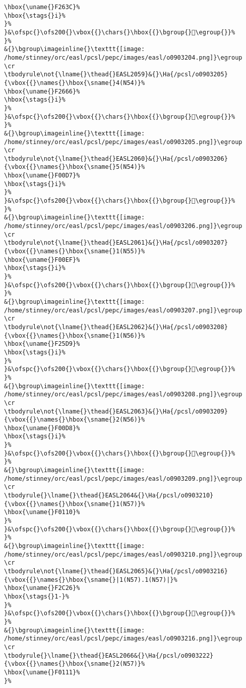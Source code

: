 \begin{verbatim}
\hbox{\uname{}F263C}%
\hbox{\stags{}i}%
}%
}&\ofspc{}\ofs200{}\vbox{{}\chars{}\hbox{{}\bgroup{}󲘼\egroup{}}%
}%
&{}\bgroup\imageinline{}\texttt{[image: /home/stinney/orc/easl/pcsl/pepc/images/easl/o0903204.png]}\egroup
\cr
\tbodyrule\not{\lname{}\thead{}EASL2059}&{}\Ha{/pcsl/o0903205}{\vbox{{}\names{}\hbox{\sname{}4(N54)}%
\hbox{\uname{}F2666}%
\hbox{\stags{}i}%
}%
}&\ofspc{}\ofs200{}\vbox{{}\chars{}\hbox{{}\bgroup{}󲙦\egroup{}}%
}%
&{}\bgroup\imageinline{}\texttt{[image: /home/stinney/orc/easl/pcsl/pepc/images/easl/o0903205.png]}\egroup
\cr
\tbodyrule\not{\lname{}\thead{}EASL2060}&{}\Ha{/pcsl/o0903206}{\vbox{{}\names{}\hbox{\sname{}5(N54)}%
\hbox{\uname{}F00D7}%
\hbox{\stags{}i}%
}%
}&\ofspc{}\ofs200{}\vbox{{}\chars{}\hbox{{}\bgroup{}󰃗\egroup{}}%
}%
&{}\bgroup\imageinline{}\texttt{[image: /home/stinney/orc/easl/pcsl/pepc/images/easl/o0903206.png]}\egroup
\cr
\tbodyrule\not{\lname{}\thead{}EASL2061}&{}\Ha{/pcsl/o0903207}{\vbox{{}\names{}\hbox{\sname{}1(N55)}%
\hbox{\uname{}F00EF}%
\hbox{\stags{}i}%
}%
}&\ofspc{}\ofs200{}\vbox{{}\chars{}\hbox{{}\bgroup{}󰃯\egroup{}}%
}%
&{}\bgroup\imageinline{}\texttt{[image: /home/stinney/orc/easl/pcsl/pepc/images/easl/o0903207.png]}\egroup
\cr
\tbodyrule\not{\lname{}\thead{}EASL2062}&{}\Ha{/pcsl/o0903208}{\vbox{{}\names{}\hbox{\sname{}1(N56)}%
\hbox{\uname{}F25D9}%
\hbox{\stags{}i}%
}%
}&\ofspc{}\ofs200{}\vbox{{}\chars{}\hbox{{}\bgroup{}󲗙\egroup{}}%
}%
&{}\bgroup\imageinline{}\texttt{[image: /home/stinney/orc/easl/pcsl/pepc/images/easl/o0903208.png]}\egroup
\cr
\tbodyrule\not{\lname{}\thead{}EASL2063}&{}\Ha{/pcsl/o0903209}{\vbox{{}\names{}\hbox{\sname{}2(N56)}%
\hbox{\uname{}F00D8}%
\hbox{\stags{}i}%
}%
}&\ofspc{}\ofs200{}\vbox{{}\chars{}\hbox{{}\bgroup{}󰃘\egroup{}}%
}%
&{}\bgroup\imageinline{}\texttt{[image: /home/stinney/orc/easl/pcsl/pepc/images/easl/o0903209.png]}\egroup
\cr
\tbodyrule{}\lname{}\thead{}EASL2064&{}\Ha{/pcsl/o0903210}{\vbox{{}\names{}\hbox{\sname{}1(N57)}%
\hbox{\uname{}F0110}%
}%
}&\ofspc{}\ofs200{}\vbox{{}\chars{}\hbox{{}\bgroup{}󰄐\egroup{}}%
}%
&{}\bgroup\imageinline{}\texttt{[image: /home/stinney/orc/easl/pcsl/pepc/images/easl/o0903210.png]}\egroup
\cr
\tbodyrule\not{\lname{}\thead{}EASL2065}&{}\Ha{/pcsl/o0903216}{\vbox{{}\names{}\hbox{\sname{}|1(N57).1(N57)|}%
\hbox{\uname{}F2C26}%
\hbox{\stags{}1-}%
}%
}&\ofspc{}\ofs200{}\vbox{{}\chars{}\hbox{{}\bgroup{}󲰦\egroup{}}%
}%
&{}\bgroup\imageinline{}\texttt{[image: /home/stinney/orc/easl/pcsl/pepc/images/easl/o0903216.png]}\egroup
\cr
\tbodyrule{}\lname{}\thead{}EASL2066&{}\Ha{/pcsl/o0903222}{\vbox{{}\names{}\hbox{\sname{}2(N57)}%
\hbox{\uname{}F0111}%
}%

\end{verbatim}
